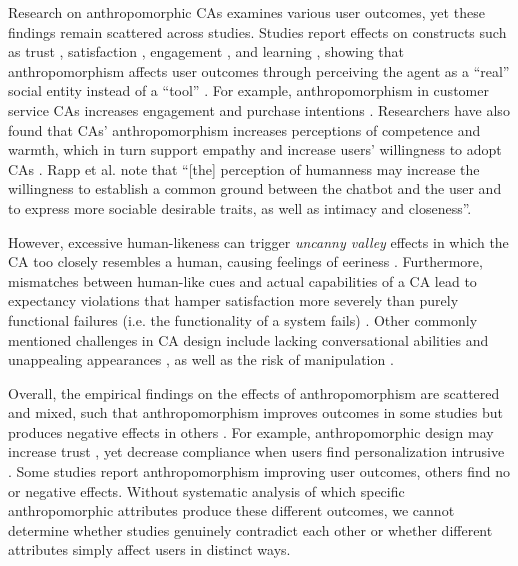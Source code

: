 \documentclass[manuscript,screen,review,anonymous]{acmart}
\begin{document}
Research on anthropomorphic CAs examines various user outcomes, yet these findings remain scattered across studies. Studies report effects on constructs such as trust \citep{nordheim2019trust}, satisfaction \citep{haugeland_understanding_2022}, engagement \citep{mehra_chatbot_2021}, and learning \citep{zheldibayeva_genai_2025}, showing that %
anthropomorphism affects user outcomes %
through perceiving the agent as a ``real'' social entity instead of a ``tool'' \citep{meyer2023leverage,wang2021seeing}. For example, anthropomorphism in customer service CAs increases engagement and purchase intentions \citep{depaula2025anthropomorphism,luo2019frontiers}. Researchers have also found that CAs' anthropomorphism increases perceptions of competence and warmth, which in turn support empathy and increase users' willingness to adopt CAs \citep{kim_what_2024}. Rapp et al. \cite{rapp_human_2021} note that ``[the] perception of humanness may increase the willingness to establish a common ground between the chatbot and the user and to express more sociable desirable traits, as well as intimacy and closeness''.

However, excessive human-likeness can trigger \textit{uncanny valley} effects in which the CA too closely resembles a human, causing feelings of eeriness \citep{mori_bukimi_1970,soni2024chatbot}. Furthermore, mismatches between human-like cues and actual capabilities of a CA lead to expectancy violations that hamper satisfaction more severely than purely functional failures (i.e. the functionality of a system fails) \citep{ischen2024communication,qu2024chatbot}. Other commonly mentioned challenges in CA design include lacking conversational abilities and unappealing appearances \citep{diederich_design_2022}, as well as the risk of manipulation \citep{chaves2021should}.

Overall, the empirical findings on the effects of anthropomorphism are scattered and mixed, such that anthropomorphism improves outcomes in some studies \citep{go2019humanizing} but produces negative effects in others \citep{crolic2022blame}. For example, anthropomorphic design may increase trust \citep{go2019humanizing,konya2023anthropomorphism}, yet decrease compliance when users find personalization intrusive \citep{chen_you_2021}. Some studies report anthropomorphism improving user outcomes, others find no or negative effects. Without systematic analysis of which specific anthropomorphic attributes produce these different outcomes, we cannot determine whether studies genuinely contradict each other or whether different attributes simply affect users in distinct ways.
\end{document}
